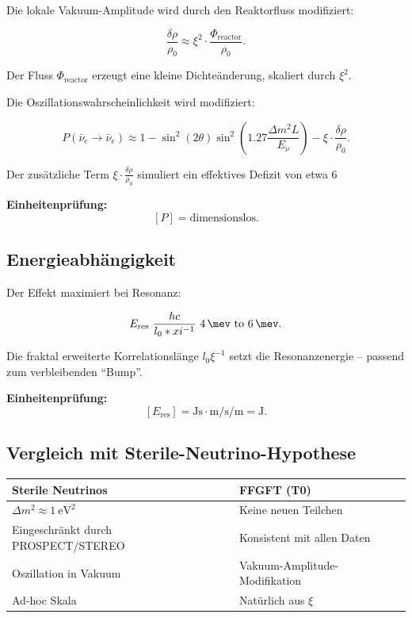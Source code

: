 	Die lokale Vakuum-Amplitude wird durch den Reaktorfluss modifiziert:
	
	\begin{equation}
		\frac{\delta \rho}{\rho_0} \approx \xi^2 \cdot \frac{\Phi_{\text{reactor}}}{\rho_0}.
	\end{equation}
	
	Der Fluss \(\Phi_{\text{reactor}}\) erzeugt eine kleine Dichteänderung, skaliert durch \(\xi^2\).
	
	Die Oszillationswahrscheinlichkeit wird modifiziert:
	
	\begin{equation}
		P(\bar{\nu}_e \to \bar{\nu}_e) \approx 1 - \sin^2(2\theta) \sin^2\left(1.27 \frac{\Delta m^2 L}{E_\nu}\right) - \xi \cdot \frac{\delta \rho}{\rho_0}.
	\end{equation}
	
	Der zusätzliche Term \(\xi \cdot \frac{\delta \rho}{\rho_0}\) simuliert ein effektives Defizit von etwa 6 %
	
	\textbf{Einheitenprüfung:}
	\[
	[P] = \text{dimensionslos}.
	\]
	
	\subsection*{Energieabhängigkeit}
	
	Der Effekt maximiert bei Resonanz:
	
	\begin{equation}
		E_{\text{res}} \approx \frac{\hbar c}{l_0 \cdot \xi^{-1}} \approx \SIrange{4}{6}{\mev}.
	\end{equation}
	
	Die fraktal erweiterte Korrelationslänge \(l_0 \xi^{-1}\) setzt die Resonanzenergie – passend zum verbleibenden \enquote{Bump}.
	
	\textbf{Einheitenprüfung:}
	\[
	[E_{\text{res}}] = \si{\joule\second} \cdot \si{\meter\per\second} / \si{\meter} = \si{\joule}.
	\]
	
	\subsection*{Vergleich mit Sterile-Neutrino-Hypothese}
	
	\begin{center}
		\begin{tabular}{p{}p{}}
			\textbf{Sterile Neutrinos} & \textbf{FFGFT (T0)} \\
			\hline
			\(\Delta m^2 \approx \SI{1}{\electronvolt\squared}\) & Keine neuen Teilchen \\
			Eingeschränkt durch PROSPECT/STEREO & Konsistent mit allen Daten \\
			Oszillation in Vakuum & Vakuum-Amplitude-Modifikation \\
			Ad-hoc Skala & Natürlich aus \(\xi\) \\
		\end{tabular}
	\end{center}
	
